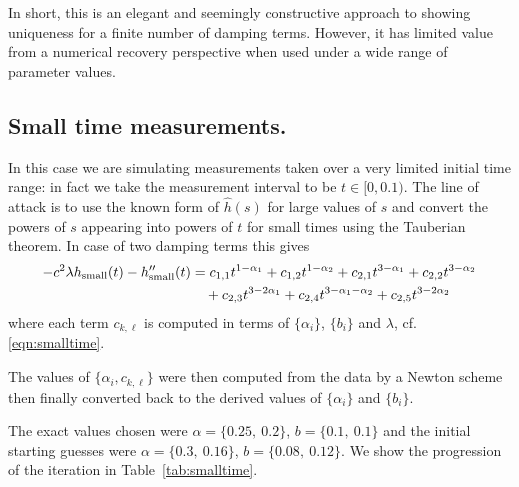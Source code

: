 In short, this is an elegant and seemingly constructive approach to showing uniqueness for a finite number of damping terms. However, it has limited value from a numerical recovery perspective when used under a wide range of parameter values.

\subsection{Small time measurements.}

In this case we are simulating measurements taken over a very limited initial
time range: in fact we take the measurement interval to be $t\in [0, 0.1)$.
The line of attack is to use the known form of $\hat{h}(s)$ for large values of $s$
and convert the powers of $s$ appearing into powers of $t$ for small times
using the Tauberian theorem.
In case of two damping terms
this gives
\begin{equation*}%
\begin{aligned}
-c^2\lambda h_{\tiny\rm{small}}(t)-h_{\tiny\rm{small}}''(t) 
&
=c_{1,1} t^{1-\alpha_1}
+c_{1,2} t^{1-\alpha_2}
+c_{2,1} t^{3-\alpha_1}
+c_{2,2} t^{3-\alpha_2}
\\&\quad
+c_{2,3} t^{3-2\alpha_1}
+c_{2,4} t^{3-\alpha_1-\alpha_2}
+c_{2,5} t^{3-2\alpha_2}
\end{aligned}
\end{equation*}
where each term $c_{k,\ell}$ is computed in terms of
$\{\alpha_i\}$, $\{b_i\}$ and $\lambda$, %
cf. \eqref{eqn:smalltime}. 
							         
The values of $\{\alpha_i,c_{k,\ell}\}$ 
were then computed from the data by a Newton
scheme then finally converted back to the derived values of
$\{\alpha_i\}$ and $\{b_i\}$.

The exact values chosen were
$\alpha = \{0.25,\ 0.2\}$, $b = \{0.1,\ 0.1\}$ and the
initial starting guesses were $\alpha = \{0.3,\ 0.16\}$, $b = \{0.08,\ 0.12\}$.
We show the progression of the iteration in 
Table~\ref{tab:smalltime}. 

